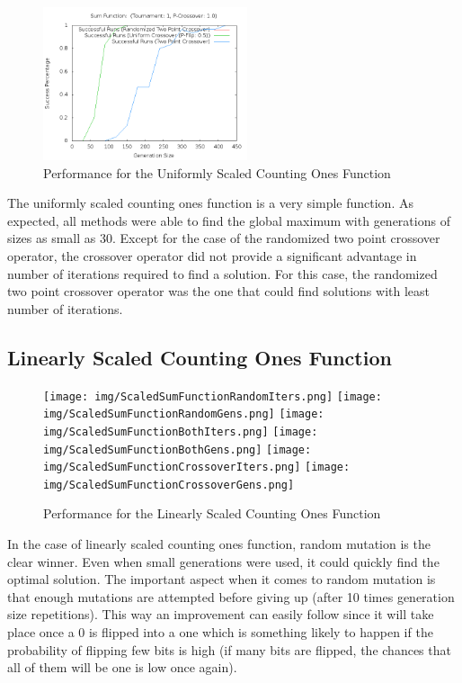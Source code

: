 \documentclass[10pt]{article}
\begin{document}
\begin{figure}[h!]
    \includegraphics[height=170px]{img/SumFunctionCrossoverGens.png}
    \caption{Performance for the Uniformly Scaled Counting Ones Function}
\end{figure}

The uniformly scaled counting ones function is a very simple function. As expected, all methods were able to find the global maximum with generations of sizes as small as 30. Except for the case of the randomized two point crossover operator, the crossover operator did not provide a significant advantage in number of iterations required to find a solution. For this case, the randomized two point crossover operator was the one that could find solutions with least number of iterations.

\pagebreak
\subsection{Linearly Scaled Counting Ones Function}

\begin{figure}[h!]
  \centering
    \texttt{[image: img/ScaledSumFunctionRandomIters.png]}
    \texttt{[image: img/ScaledSumFunctionRandomGens.png]}
    \texttt{[image: img/ScaledSumFunctionBothIters.png]}
    \texttt{[image: img/ScaledSumFunctionBothGens.png]}
    \texttt{[image: img/ScaledSumFunctionCrossoverIters.png]}
    \texttt{[image: img/ScaledSumFunctionCrossoverGens.png]}
    \caption{Performance for the Linearly Scaled Counting Ones Function}
\end{figure}

In the case of linearly scaled counting ones function, random mutation is the clear winner. Even when small generations were used, it could quickly find the optimal solution. The important aspect when it comes to random mutation is that enough mutations are attempted before giving up (after 10 times generation size repetitions). This way an improvement can easily follow since it will take place once a 0 is flipped into a one which is something likely to happen if the probability of flipping few bits is high (if many bits are flipped, the chances that all of them will be one is low once again).
\end{document}
